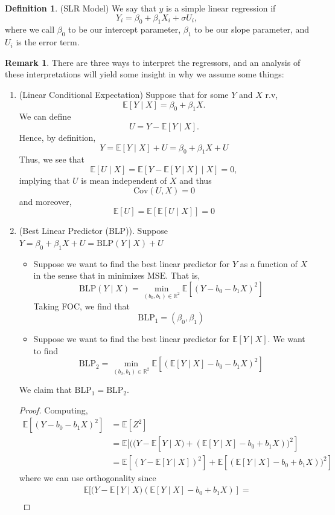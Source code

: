 \documentclass[10pt, oneside]{article}
\newcommand{\bbR}{\mathbb{R}}
\newcommand{\Cov}{\text{Cov}}
\newcommand{\bbE}{\mathbb{E}}
\theoremstyle{definition}
\newtheorem{defn}{Definition}
\newtheorem{rem}{Remark}
\begin{document}
\begin{defn}
    (SLR Model) We say that $y$ is a simple linear regression if 
    \[Y_i = \beta_0 + \beta_1X_i + \sigma U_i,\] where we call $\beta_0$ to be our intercept parameter, $\beta_1$ to be our slope parameter, and $U_i$ is the error term. 
\end{defn}
\begin{rem}
There are three ways to interpret the regressors, and an analysis of these interpretations will yield some insight in why we assume some things:
\begin{enumerate}
    \item (Linear Conditional Expectation)     Suppose that for some $Y$ and $X$ r.v,
    \[\bbE[Y \mid X] = \beta_0 + \beta_1 X.\] We can define 
    \[U = Y - \bbE[Y \mid X].\] Hence, by definition, 
    \[Y = \bbE[Y \mid X] + U = \beta_0 + \beta_1 X + U\] Thus, we see that 
    \[\bbE[U \mid X] = \bbE[Y - \bbE[Y \mid X] \mid X] = 0,\] implying that $U$ is mean independent of $X$ and thus 
    \[\Cov(U,X) = 0\] and moreover, 
    \[\bbE[U] = \bbE[\bbE[U \mid X]] = 0\]
    \item     (Best Linear Predictor (BLP)). Suppose $Y = \beta_0 + \beta_1 X + U = \text{BLP}(Y \mid X) + U$
    \begin{itemize}
        \item Suppose we want to find the best linear predictor for $Y$ as a function of $X$ in the sense that in minimizes $\text{MSE}.$ That is, 
        \[\text{BLP}(Y \mid X) = \min_{(b_0, b_1) \in \bbR^2} \bbE[(Y - b_0 - b_1 X)^2]\] Taking FOC, we find that 
        \[\text{BLP}_1 = (\beta_0, \beta_1)\]
        \item Suppose we want to find the best linear predictor for $\bbE[Y \mid X].$  We want to find 
        \[\text{BLP}_2 = \min_{(b_0, b_1)\in \bbR^2} \bbE[ (\bbE[Y \mid X] - b_0 - b_1 X)^2]\]
    \end{itemize}
    We claim that $\text{BLP}_1 = \text{BLP}_2.$ 
    \begin{proof}
Computing, 
\begin{align*}
    \bbE[(Y - b_0 - b_1 X)^2] &= \bbE[Z^2]\\
    &= \bbE[((Y - \bbE[Y \mid X) + (\bbE[Y \mid X] - b_0 + b_1 X))^2]\\
    &= \bbE[(Y - \bbE[Y \mid X])^2] + \bbE[(\bbE[Y \mid X] - b_0 + b_1 X))^2]
\end{align*}
where we can use orthogonality since 
\begin{align*}
   & \bbE[(Y - \bbE[Y \mid X) (\bbE[Y \mid X] - b_0 + b_1 X)] =\\

\end{align*}
\end{proof}
\end{enumerate}
\end{rem}
\end{document}
